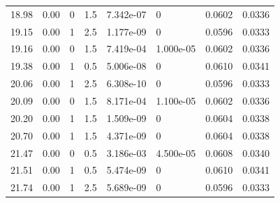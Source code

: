 \documentclass[preview]{standalone}
\begin{document}
{{{\begin{tabular}{L{1.2cm}C{1.2cm} C{0.3cm}C{0.5cm} C{1.4cm}C{1.4cm} C{1.4cm}C{1.4cm}}
  18.98  &  0.00  & 0     & 1.5 &  7.342e-07  & 0  & 0.0602 &  0.0336   \\ 
  19.15  &  0.00  & 1     & 2.5 &  1.177e-09  & 0  & 0.0596 &  0.0333   \\ 
  19.16  &  0.00  & 0     & 1.5 &  7.419e-04  & 1.000e-05  & 0.0602 &  0.0336   \\ 
  19.38  &  0.00  & 1     & 0.5 &  5.006e-08  & 0  & 0.0610 &  0.0341   \\ 
  20.06  &  0.00  & 1     & 2.5 &  6.308e-10  & 0  & 0.0596 &  0.0333   \\ 
  20.09  &  0.00  & 0     & 1.5 &  8.171e-04  & 1.100e-05  & 0.0602 &  0.0336   \\ 
  20.20  &  0.00  & 1     & 1.5 &  1.509e-09  & 0  & 0.0604 &  0.0338   \\ 
  20.70  &  0.00  & 1     & 1.5 &  4.371e-09  & 0  & 0.0604 &  0.0338   \\ 
  21.47  &  0.00  & 0     & 0.5 &  3.186e-03  & 4.500e-05  & 0.0608 &  0.0340   \\ 
  21.51  &  0.00  & 1     & 0.5 &  5.474e-09  & 0  & 0.0610 &  0.0341   \\ 
  21.74  &  0.00  & 1     & 2.5 &  5.689e-09  & 0  & 0.0596 &  0.0333   \\ 
\hline 
\end{tabular} 

}}}
\end{document}

